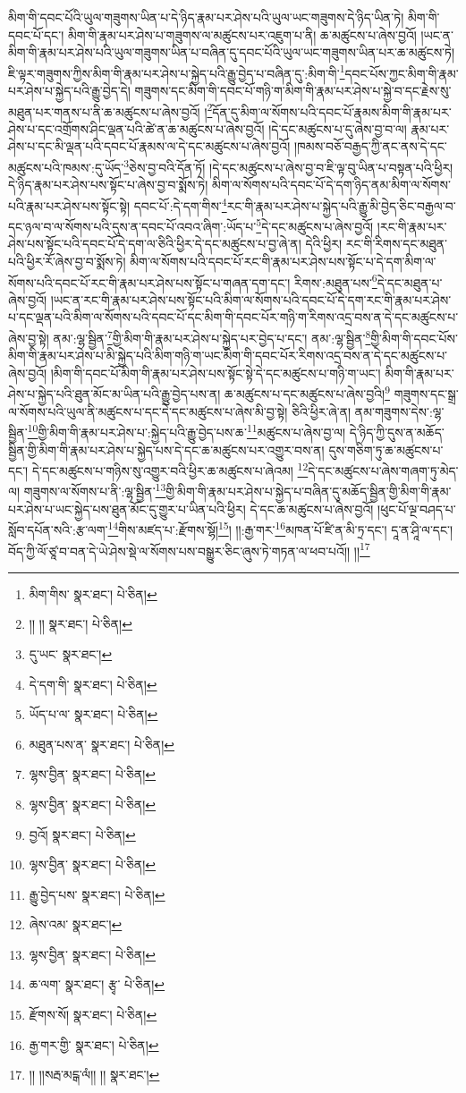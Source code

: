 མིག་གི་དབང་པོའི་ཡུལ་གཟུགས་ཡིན་པ་དེ་ཉིད་རྣམ་པར་ཤེས་པའི་ཡུལ་ཡང་གཟུགས་དེ་ཉིད་ཡིན་ཏེ། མིག་གི་དབང་པོ་དང་། མིག་གི་རྣམ་པར་ཤེས་པ་གཟུགས་ལ་མཚུངས་པར་འཇུག་པ་ནི། ཆ་མཚུངས་པ་ཞེས་བྱའོ། །ཡང་ན་མིག་གི་རྣམ་པར་ཤེས་པའི་ཡུལ་གཟུགས་ཡིན་པ་བཞིན་དུ་དབང་པོའི་ཡུལ་ཡང་གཟུགས་ཡིན་པར་ཆ་མཚུངས་ཏེ། ཇི་ལྟར་གཟུགས་ཀྱིས་མིག་གི་རྣམ་པར་ཤེས་པ་སྐྱེད་པའི་རྒྱུ་བྱེད་པ་བཞིན་དུ་:མིག་གི་\footnote{མིག་གིས་  སྣར་ཐང་།  པེ་ཅིན། }དབང་པོས་ཀྱང་མིག་གི་རྣམ་པར་ཤེས་པ་སྐྱེད་པའི་རྒྱུ་བྱེད་དེ། གཟུགས་དང་མིག་གི་དབང་པོ་གཉི་ག་མིག་གི་རྣམ་པར་ཤེས་པ་སྐྱེ་བ་དང་རྗེས་སུ་མཐུན་པར་གནས་པ་ནི་ཆ་མཚུངས་པ་ཞེས་བྱའོ། །\footnote{།། །།  སྣར་ཐང་།  པེ་ཅིན། }དོན་དུ་མིག་ལ་སོགས་པའི་དབང་པོ་རྣམས་མིག་གི་རྣམ་པར་ཤེས་པ་དང་འགྲོགས་ཤིང་ལྡན་པའི་ཚེ་ན་ཆ་མཚུངས་པ་ཞེས་བྱའོ། །དེ་དང་མཚུངས་པ་དུ་ཞེས་བྱ་བ་ལ། རྣམ་པར་ཤེས་པ་དང་མི་ལྡན་པའི་དབང་པོ་རྣམས་ལ་དེ་དང་མཚུངས་པ་ཞེས་བྱའོ། །ཁམས་བཅོ་བརྒྱད་ཀྱི་ནང་ནས་དེ་དང་མཚུངས་པའི་ཁམས་:དུ་ཡོད་\footnote{དུ་ཡང་  སྣར་ཐང་། }ཅེས་བྱ་བའི་དོན་ཏོ། །དེ་དང་མཚུངས་པ་ཞེས་བྱ་བ་ཇི་ལྟ་བུ་ཡིན་པ་བསྟན་པའི་ཕྱིར། དེ་ཉིད་རྣམ་པར་ཤེས་པས་སྟོང་པ་ཞེས་བྱ་བ་སྨོས་ཏེ། མིག་ལ་སོགས་པའི་དབང་པོ་དེ་དག་ཉིད་ནམ་མིག་ལ་སོགས་པའི་རྣམ་པར་ཤེས་པས་སྟོང་སྟེ། དབང་པོ་:དེ་དག་གིས་\footnote{དེ་དག་གི་  སྣར་ཐང་།  པེ་ཅིན། }རང་གི་རྣམ་པར་ཤེས་པ་སྐྱེད་པའི་རྒྱུ་མི་བྱེད་ཅིང་བརྒྱལ་བ་དང་ཉལ་བ་ལ་སོགས་པའི་དུས་ན་དབང་པོ་འབའ་ཞིག་:ཡོད་པ་\footnote{ཡོད་པ་ལ་  སྣར་ཐང་།  པེ་ཅིན། }དེ་དང་མཚུངས་པ་ཞེས་བྱའོ། །རང་གི་རྣམ་པར་ཤེས་པས་སྟོང་པའི་དབང་པོ་དེ་དག་ལ་ཅིའི་ཕྱིར་དེ་དང་མཚུངས་པ་བྱ་ཞེ་ན། དེའི་ཕྱིར། རང་གི་རིགས་དང་མཐུན་པའི་ཕྱིར་རོ་ཞེས་བྱ་བ་སྨོས་ཏེ། མིག་ལ་སོགས་པའི་དབང་པོ་རང་གི་རྣམ་པར་ཤེས་པས་སྟོང་པ་དེ་དག་མིག་ལ་སོགས་པའི་དབང་པོ་རང་གི་རྣམ་པར་ཤེས་པས་སྟོང་པ་གཞན་དག་དང་། རིགས་:མཐུན་པས་\footnote{མཐུན་པས་ན་  སྣར་ཐང་།  པེ་ཅིན། }དེ་དང་མཐུན་པ་ཞེས་བྱའོ། །ཡང་ན་རང་གི་རྣམ་པར་ཤེས་པས་སྟོང་པའི་མིག་ལ་སོགས་པའི་དབང་པོ་དེ་དག་རང་གི་རྣམ་པར་ཤེས་པ་དང་ལྡན་པའི་མིག་ལ་སོགས་པའི་དབང་པོ་དང་མིག་གི་དབང་པོར་གཉི་ག་རིགས་འདྲ་བས་ན་དེ་དང་མཚུངས་པ་ཞེས་བྱ་སྟེ། ནམ་:ལྷ་སྦྱིན་\footnote{ལྷས་བྱིན་  སྣར་ཐང་།  པེ་ཅིན། }གྱི་མིག་གི་རྣམ་པར་ཤེས་པ་སྐྱེད་པར་བྱེད་པ་དང་། ནམ་:ལྷ་སྦྱིན་\footnote{ལྷས་བྱིན་  སྣར་ཐང་།  པེ་ཅིན། }གྱི་མིག་གི་དབང་པོས་མིག་གི་རྣམ་པར་ཤེས་པ་མི་སྐྱེད་པའི་མིག་གཉི་ག་ཡང་མིག་གི་དབང་པོར་རིགས་འདྲ་བས་ན་དེ་དང་མཚུངས་པ་ཞེས་བྱའོ། །མིག་གི་དབང་པོ་མིག་གི་རྣམ་པར་ཤེས་པས་སྟོང་སྟེ་དེ་དང་མཚུངས་པ་གཉི་ག་ཡང་། མིག་གི་རྣམ་པར་ཤེས་པ་སྐྱེད་པའི་ཐུན་མོང་མ་ཡིན་པའི་རྒྱུ་བྱེད་པས་ན། ཆ་མཚུངས་པ་དང་མཚུངས་པ་ཞེས་བྱའི།\footnote{བྱའོ།  སྣར་ཐང་།  པེ་ཅིན། } གཟུགས་དང་སྒྲ་ལ་སོགས་པའི་ཡུལ་ནི་མཚུངས་པ་དང་དེ་དང་མཚུངས་པ་ཞེས་མི་བྱ་སྟེ། ཅིའི་ཕྱིར་ཞེ་ན། ནམ་གཟུགས་དེས་:ལྷ་སྦྱིན་\footnote{ལྷས་བྱིན་  སྣར་ཐང་།  པེ་ཅིན། }གྱི་མིག་གི་རྣམ་པར་ཤེས་པ་:སྐྱེད་པའི་རྒྱུ་བྱེད་པས་ཆ་\footnote{རྒྱུ་བྱེད་པས་  སྣར་ཐང་།  པེ་ཅིན། }མཚུངས་པ་ཞེས་བྱ་ལ། དེ་ཉིད་ཀྱི་དུས་ན་མཆོད་སྦྱིན་གྱི་མིག་གི་རྣམ་པར་ཤེས་པ་སྐྱེད་པས་དེ་དང་ཆ་མཚུངས་པར་འགྱུར་བས་ན། དུས་གཅིག་ཏུ་ཆ་མཚུངས་པ་དང་། དེ་དང་མཚུངས་པ་གཉིས་སུ་འགྱུར་བའི་ཕྱིར་ཆ་མཚུངས་པ་ཞེའམ། \footnote{ཞེས་འམ་  སྣར་ཐང་། }དེ་དང་མཚུངས་པ་ཞེས་གཞག་ཏུ་མེད་ལ། གཟུགས་ལ་སོགས་པ་ནི་:ལྷ་སྦྱིན་\footnote{ལྷས་བྱིན་  སྣར་ཐང་།  པེ་ཅིན། }གྱི་མིག་གི་རྣམ་པར་ཤེས་པ་སྐྱེད་པ་བཞིན་དུ་མཆོད་སྦྱིན་གྱི་མིག་གི་རྣམ་པར་ཤེས་པ་ཡང་སྐྱེད་པས་ཐུན་མོང་དུ་གྱུར་པ་ཡིན་པའི་ཕྱིར། དེ་དང་ཆ་མཚུངས་པ་ཞེས་བྱའོ། །ཕུང་པོ་ལྔ་བཤད་པ་སློབ་དཔོན་སའི་:རྩ་ལག་\footnote{ཆ་ལག་  སྣར་ཐང་། རྩྭ་  པེ་ཅིན། }གིས་མཛད་པ་:རྫོགས་སྷོ།\footnote{རྫོགས་སོ།  སྣར་ཐང་།  པེ་ཅིན། }། །།:རྒྱ་གར་\footnote{རྒྱ་གར་གྱི་  སྣར་ཐང་།  པེ་ཅིན། }མཁན་པོ་ཛི་ན་མི་ཏྲ་དང་། དཱ་ན་ཤཱི་ལ་དང་། བོད་ཀྱི་ལོ་ཙཱ་བ་བན་དེ་ཡེ་ཤེས་སྡེ་ལ་སོགས་པས་བསྒྱུར་ཅིང་ཞུས་ཏེ་གཏན་ལ་ཕབ་པའོ།། །།\footnote{།། །།སརྦ་མངྒ་ལཾ།། །།  སྣར་ཐང་། }